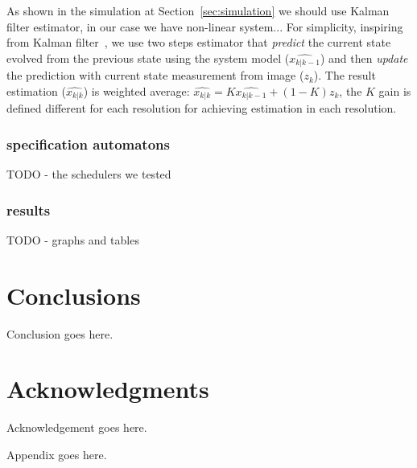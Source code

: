 \documentclass{sig-alternate-ipsn13}
\begin{document}
As shown in the simulation at Section~\ref{sec:simulation} we should use Kalman filter estimator, in our case we have non-linear system... %
For simplicity, inspiring from Kalman filter~\cite{??? kalman}, we use two steps estimator that \textit{predict} the current state evolved from the previous state using the system model ($\hat{x_{k|k-1}}$) and then \textit{update} the prediction with current state measurement from image ($z_k$).
The result estimation ($\hat{x_{k|k}}$) is weighted average: 
$ \hat{x_{k|k}} = K \hat{x_{k|k-1}} + (1-K) z_k $, 
the $K$ gain is defined different for each resolution for achieving estimation in each resolution.

\subsubsection{specification automatons}
TODO - the schedulers we tested

\subsubsection{results}
TODO - graphs and tables


\section{Conclusions}
Conclusion goes here.


\section*{Acknowledgments}
Acknowledgement goes here.


%

%
%
\appendix

Appendix goes here.

\end{document}
